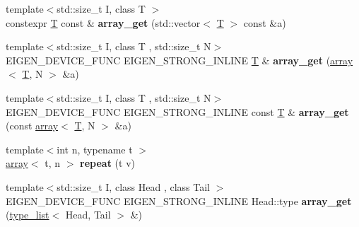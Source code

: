 \begin{DoxyCompactItemize}
{\footnotesize template$<$std\+::size\+\_\+t I, class T $>$ }\\constexpr \hyperlink{group___sparse_core___module}{T} const  \& {\bfseries array\+\_\+get} (std\+::vector$<$ \hyperlink{group___sparse_core___module}{T} $>$ const \&a)
\item 
\mbox{\label{namespace_eigen_1_1internal_a7c3410c6ef10661c1cb3aa844b767885}} 
{\footnotesize template$<$std\+::size\+\_\+t I, class T , std\+::size\+\_\+t N$>$ }\\E\+I\+G\+E\+N\+\_\+\+D\+E\+V\+I\+C\+E\+\_\+\+F\+U\+NC E\+I\+G\+E\+N\+\_\+\+S\+T\+R\+O\+N\+G\+\_\+\+I\+N\+L\+I\+NE \hyperlink{group___sparse_core___module}{T} \& {\bfseries array\+\_\+get} (\hyperlink{class_eigen_1_1array}{array}$<$ \hyperlink{group___sparse_core___module}{T}, N $>$ \&a)
\item 
\mbox{\label{namespace_eigen_1_1internal_afdb094204a35dc4eb8692a83943f04d2}} 
{\footnotesize template$<$std\+::size\+\_\+t I, class T , std\+::size\+\_\+t N$>$ }\\E\+I\+G\+E\+N\+\_\+\+D\+E\+V\+I\+C\+E\+\_\+\+F\+U\+NC E\+I\+G\+E\+N\+\_\+\+S\+T\+R\+O\+N\+G\+\_\+\+I\+N\+L\+I\+NE const \hyperlink{group___sparse_core___module}{T} \& {\bfseries array\+\_\+get} (const \hyperlink{class_eigen_1_1array}{array}$<$ \hyperlink{group___sparse_core___module}{T}, N $>$ \&a)
\item 
\mbox{\label{namespace_eigen_1_1internal_a9f2d59f81328c49b69e24e49ba209812}} 
{\footnotesize template$<$int n, typename t $>$ }\\\hyperlink{class_eigen_1_1array}{array}$<$ t, n $>$ {\bfseries repeat} (t v)
\item 
\mbox{\label{namespace_eigen_1_1internal_a3c8f04865d8e8f811636f8c6b0f79cb7}} 
{\footnotesize template$<$std\+::size\+\_\+t I, class Head , class Tail $>$ }\\E\+I\+G\+E\+N\+\_\+\+D\+E\+V\+I\+C\+E\+\_\+\+F\+U\+NC E\+I\+G\+E\+N\+\_\+\+S\+T\+R\+O\+N\+G\+\_\+\+I\+N\+L\+I\+NE Head\+::type {\bfseries array\+\_\+get} (\hyperlink{struct_eigen_1_1internal_1_1type__list}{type\+\_\+list}$<$ Head, Tail $>$ \&)
\item 
\mbox{\label{namespace_eigen_1_1internal_ade8b0ba989c357bfc1096a718882ce80}} 

\end{DoxyCompactItemize}
